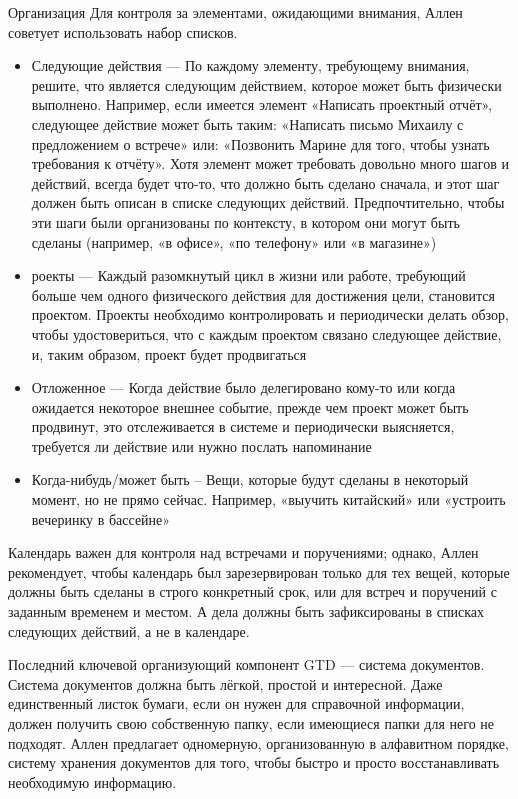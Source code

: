\documentclass{../industrial-development}
\begin{document}
Организация
Для контроля за элементами, ожидающими внимания, Аллен советует использовать набор списков.
\begin{itemize}
\item Следующие действия --- По каждому элементу, требующему внимания, решите, что является следующим действием, которое может быть физически выполнено. Например, если имеется элемент «Написать проектный отчёт», следующее действие может быть таким: «Написать письмо Михаилу с предложением о встрече» или: «Позвонить Марине для того, чтобы узнать требования к отчёту». Хотя элемент может требовать довольно много шагов и действий, всегда будет что-то, что должно быть сделано сначала, и этот шаг должен быть описан в списке следующих действий. Предпочтительно, чтобы эти шаги были организованы по контексту, в котором они могут быть сделаны (например, «в офисе», «по телефону» или «в магазине»)
\item роекты --- Каждый разомкнутый цикл в жизни или работе, требующий больше чем одного физического действия для достижения цели, становится проектом. Проекты необходимо контролировать и периодически делать обзор, чтобы удостовериться, что с каждым проектом связано следующее действие, и, таким образом, проект будет продвигаться
\item Отложенное --- Когда действие было делегировано кому-то или когда ожидается некоторое внешнее событие, прежде чем проект может быть продвинут, это отслеживается в системе и периодически выясняется, требуется ли действие или нужно послать напоминание
\item Когда-нибудь/может быть -- Вещи, которые будут сделаны в некоторый момент, но не прямо сейчас. Например, «выучить китайский» или «устроить вечеринку в бассейне»
\end{itemize}

Календарь важен для контроля над встречами и поручениями; однако, Аллен рекомендует, чтобы календарь был зарезервирован только для тех вещей, которые должны быть сделаны в строго конкретный срок, или для встреч и поручений с заданным временем и местом. А дела должны быть зафиксированы в списках следующих действий, а не в календаре.

Последний ключевой организующий компонент GTD — система документов. Система документов должна быть лёгкой, простой и интересной. Даже единственный листок бумаги, если он нужен для справочной информации, должен получить свою собственную папку, если имеющиеся папки для него не подходят. Аллен предлагает одномерную, организованную в алфавитном порядке, систему хранения документов для того, чтобы быстро и просто восстанавливать необходимую информацию.
\end{document}

